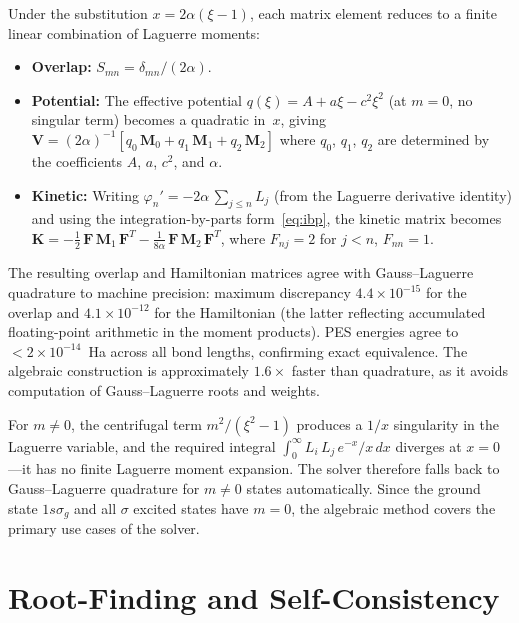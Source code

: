 \documentclass[aps,pra,twocolumn,superscriptaddress,longbibliography]{revtex4-2}
\begin{document}
Under the substitution $x = 2\alpha(\xi - 1)$, each matrix element
reduces to a finite linear combination of Laguerre moments:
\begin{itemize}
  \item \textbf{Overlap:} $S_{mn} = \delta_{mn}/(2\alpha)$.
  \item \textbf{Potential:} The effective potential
    $q(\xi) = A + a\xi - c^2\xi^2$ (at $m = 0$, no singular term)
    becomes a quadratic in~$x$, giving
    $\mathbf{V} = (2\alpha)^{-1}[q_0\,\mathbf{M}_0 + q_1\,\mathbf{M}_1
    + q_2\,\mathbf{M}_2]$
    where $q_0$, $q_1$, $q_2$ are determined by the coefficients $A$,
    $a$, $c^2$, and $\alpha$.
  \item \textbf{Kinetic:} Writing $\varphi_n' = -2\alpha\,\sum_{j \le n} L_j$
    (from the Laguerre derivative identity) and using the
    integration-by-parts form~\eqref{eq:ibp}, the kinetic matrix becomes
    $\mathbf{K} = -\tfrac{1}{2}\,\mathbf{F}\,\mathbf{M}_1\,\mathbf{F}^T
    - \tfrac{1}{8\alpha}\,\mathbf{F}\,\mathbf{M}_2\,\mathbf{F}^T$,
    where $F_{nj} = 2$ for $j < n$, $F_{nn} = 1$.
\end{itemize}

The resulting overlap and Hamiltonian matrices agree with
Gauss--Laguerre quadrature to machine precision: maximum discrepancy
$4.4 \times 10^{-15}$ for the overlap and $4.1 \times 10^{-12}$ for the
Hamiltonian (the latter reflecting accumulated floating-point arithmetic
in the moment products).  PES energies agree to $< 2 \times 10^{-14}$~Ha
across all bond lengths, confirming exact equivalence.  The algebraic
construction is approximately $1.6\times$ faster than quadrature,
as it avoids computation of Gauss--Laguerre roots and weights.

For $m \neq 0$, the centrifugal term $m^2/(\xi^2 - 1)$ produces
a $1/x$ singularity in the Laguerre variable, and the required
integral $\int_0^\infty L_i\,L_j\,e^{-x}/x\,dx$ diverges at
$x = 0$---it has no finite Laguerre moment expansion.  The solver
therefore falls back to Gauss--Laguerre quadrature for $m \neq 0$
states automatically.  Since the ground state $1s\sigma_g$ and all
$\sigma$ excited states have $m = 0$, the algebraic method covers
the primary use cases of the solver.


\section{Root-Finding and Self-Consistency}
\label{sec:rootfinding}
\end{document}
